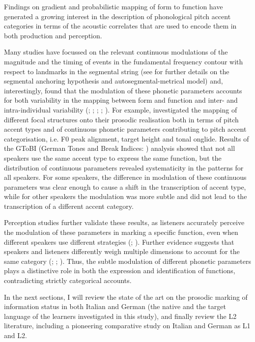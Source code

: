 Findings on gradient and probabilistic mapping of form to function have generated a growing interest in the description of phonological pitch accent categories in terms of the acoustic correlates that are used to encode them in both production and perception.

Many studies have focussed on the relevant continuous modulations of the magnitude and the timing of events in the fundamental frequency contour with respect to landmarks in the segmental string (see  for further details on the segmental anchoring hypothesis and autosegmental-metrical model) and, interestingly, found that the modulation of these phonetic parameters accounts for both variability in the mapping between form and function and inter- and intra-individual variability (\citealt{CangemiEtAl2016}; \citealt{CangemiGrice2016}; \citealt{CangemiEtAl2015}; \citealt{GriceEtAl2017}; \citealt{MückeGrice2014}). For example, \citet{GriceEtAl2017} investigated the mapping of different focal structures onto their prosodic realisation both in terms of pitch accent types and of continuous phonetic parameters contributing to pitch accent categorisation, i.e. F0 peak alignment, target height and tonal onglide. Results of the GToBI (German Tones and Break Indices: \citealt{GriceEtAl2005}) analysis showed that not all speakers use the same accent type to express the same function, but the distribution of continuous parameters revealed systematicity in the patterns for all speakers. For some speakers, the difference in modulation of these continuous parameters was clear enough to cause a shift in the transcription of accent type, while for other speakers the modulation was more subtle and did not lead to the transcription of a different accent category.

Perception studies further validate these results, as listeners accurately perceive the modulation of these parameters in marking a specific function, even when different speakers use different strategies (\citealt{CangemiEtAl2015}; \citealt{GriceEtAl2017}). Further evidence suggests that speakers and listeners differently weigh multiple dimensions to account for the same category (\citealt{CangemiEtAl2015}; \citealt{GriceEtAl2017}; \citealt{NiebuhrEtAl2011}). Thus, the subtle modulation of different phonetic parameters plays a distinctive role in both the expression and identification of functions, contradicting strictly categorical accounts.

In the next sections, I will review the state of the art on the prosodic marking of information status in both Italian and German (the native and the target language of the learners investigated in this study), and finally review the L2 literature, including a pioneering comparative study on Italian and German as L1 and L2.

